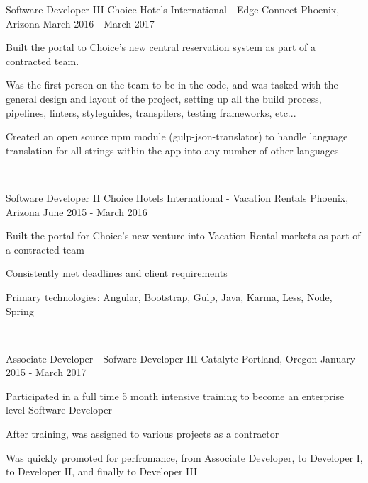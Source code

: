\begin{cventries}
  \cventry
    {Software Developer III}
    {Choice Hotels International - Edge Connect}
    {Phoenix, Arizona}
    {March 2016 - March 2017}
    {
      \begin{cvitems}
        \item {Built the portal to Choice's new central reservation system as part of a contracted team.}
        \item {Was the first person on the team to be in the code, and was tasked with the general design and layout of the project, setting up all the build process, pipelines, linters, styleguides, transpilers, testing frameworks, etc...}
        \item {Created an open source npm module (gulp-json-translator) to handle language translation for all strings within the app into any number of other languages}
      \end{cvitems}
    }

  ~


  \cventry
    {Software Developer II}
    {Choice Hotels International - Vacation Rentals}
    {Phoenix, Arizona}
    {June 2015 - March 2016}
    {
      \begin{cvitems}
        \item {Built the portal for Choice's new venture into Vacation Rental markets as part of a contracted team}
        \item {Consistently met deadlines and client requirements}
        \item {Primary technologies: Angular, Bootstrap, Gulp, Java, Karma, Less, Node, Spring}
      \end{cvitems}
    }

  ~


  \cventry
    {Associate Developer - Sofware Developer III}
    {Catalyte}
    {Portland, Oregon}
    {January 2015 - March 2017}
    {
      \begin{cvitems}
        \item {Participated in a full time 5 month intensive training to become an enterprise level Software Developer}
        \item {After training, was assigned to various projects as a contractor}
        \item {Was quickly promoted for perfromance, from Associate Developer, to Developer I, to Developer II, and finally to Developer III}
      \end{cvitems}
    }


\end{cventries}
